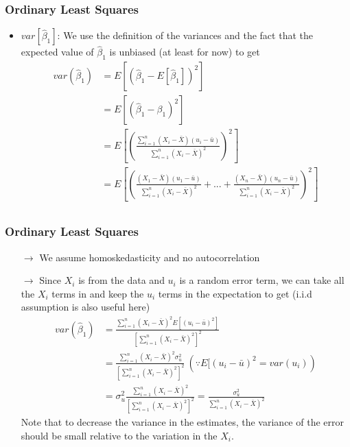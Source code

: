 \documentclass[compress]{beamer}
\begin{document}
\begin{frame}
\frametitle{Ordinary Least Squares}
\begin{itemize}
\item $var[\hat{\beta}_1]$: We use the definition of the variances and the fact that the expected value of $\hat{\beta}_1$ is unbiased (at least for now) to get
\[
\begin{aligned}
var(\hat{\beta}_1)&=E\left[\left(\hat{\beta}_1-E[\hat{\beta}_1]\right)^2\right] \\
&=E\left[\left(\hat{\beta}_1-{\beta}_1\right)^2\right]\\
&=E\left[\left( \frac{\sum_{i=1}^n(X_i-\bar{X})(u_i-\bar{u})}{\sum_{i=1}^n(X_i-\bar{X})^2} \right)^2\right]\\
&=E\left[\left(  \frac{(X_1-\bar{X})(u_1-\bar{u})}{\sum_{i=1}^n(X_i-\bar{X})^2}+...+\frac{(X_n-\bar{X})(u_n-\bar{u})}{\sum_{i=1}^n(X_i-\bar{X})^2} \right)^2\right]\\
\end{aligned}
\]
\end{itemize}
\end{frame}

\begin{frame}
\frametitle{Ordinary Least Squares}
\begin{itemize}
\item[$\to$] We assume homoskedasticity and no autocorrelation
\item[$\to$] Since $X_i$ is from the data and $u_i$ is a random error term, we can take all the $X_i$ terms in and keep the $u_i$ terms in the expectation to get (i.i.d assumption is also useful here)
\[
\begin{aligned}
var(\hat{\beta}_1)&=\frac{\sum_{i=1}^n(X_i-\bar{X})^2E[(u_i-\bar{u})^2]}{[\sum_{i=1}^n(X_i-\bar{X})^2]^2}\\
&=\frac{\sum_{i=1}^n(X_i-\bar{X})^2\sigma_u^2}{[\sum_{i=1}^n(X_i-\bar{X})^2]^2} \ (\because E[(u_i-\bar{u})^2=var(u_i))\\
&=\sigma_u^2\frac{\sum_{i=1}^n(X_i-\bar{X})^2}{[\sum_{i=1}^n(X_i-\bar{X})^2]^2} =\frac{\sigma_u^2}{\sum_{i=1}^n(X_i-\bar{X})^2}
\end{aligned}
\]
Note that  to decrease the variance in the estimates, the variance of the error should be small relative to the variation in the $X_i$. 
\end{itemize}
\end{frame}
\end{document}
